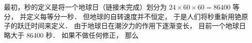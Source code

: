 
最初，秒的定义是将一个地球日（链接未完成）划分为 $24\times60\times60 = 86400$ 等分， 并定义每等分一秒． 但地球的自转速度并不恒定， 于是人们将秒重新用铯原子的跃迁时间来定义． 由于地球日在潮汐力的作用下逐渐变长， 目前一个地球日略大于 86400 秒． 如果不做任何修正， 那么
